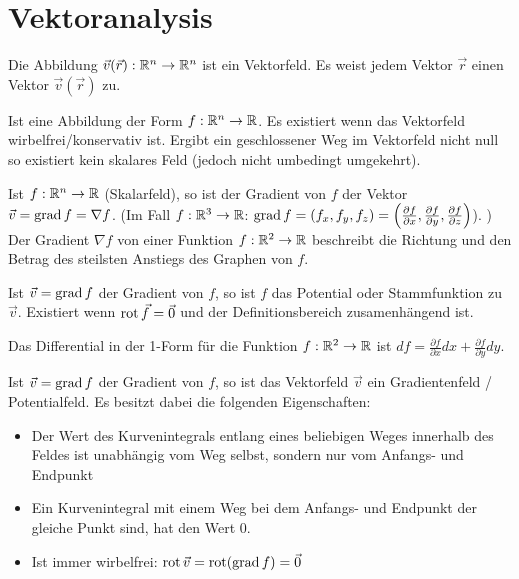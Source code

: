 \section{Vektoranalysis}
\begin{definition}[Vektorfeld]
Die Abbildung $\vec{v}(\vec{r}): \mathbb{R}^n \to \mathbb{R}^n$ ist ein Vektorfeld. Es weist jedem
Vektor $\vec{r}$ einen Vektor $\vec{v}(\vec{r})$ zu.
\end{definition}

\begin{definition}[Skalarfeld]
Ist eine Abbildung der Form $f: \mathbb{R}^n \to \mathbb{R}$. Es existiert wenn das Vektorfeld wirbelfrei/konservativ ist. Ergibt ein geschlossener Weg im Vektorfeld nicht null so existiert kein skalares Feld (jedoch nicht umbedingt umgekehrt).
\end{definition}

\begin{definition}[Gradient]
Ist $f: \mathbb{R}^n \to \mathbb{R}$ (Skalarfeld), so ist der Gradient von $f$ der Vektor
$\vec{v} = \operatorname{grad} f = \nabla f$. (Im Fall $f: \mathbb{R}^3 \to \mathbb{R}$:   $\operatorname{grad} f = (f_x, f_y, f_z) =
\left( \frac{\partial f}{\partial x}, \frac{\partial f}{\partial y}, \frac{\partial f}{\partial z} \right)$). ) 
Der Gradient $\nabla f$ von einer Funktion $f : \mathbb{R}^2 \to \mathbb{R}$ beschreibt die Richtung 
und den Betrag des steilsten Anstiegs des Graphen von $f$.
\end{definition}

\begin{definition}[Potential]
Ist $\vec{v} = \operatorname{grad} f$ der Gradient von $f$, so ist $f$ das Potential oder Stammfunktion zu $\vec{v}$.
Existiert wenn $\operatorname{rot} \vec{f} = \vec{0}$ und der Definitionsbereich zusamenhängend ist.
\end{definition}

\begin{definition}
Das Differential in der 1-Form für die Funktion $f : \mathbb{R}^2 \to \mathbb{R}$ ist $df =  \frac{\partial f}{\partial x}dx + \frac{\partial f}{\partial y}dy$.
\end{definition}

\begin{definition}
Ist $\vec{v} = \operatorname{grad} f$ der Gradient von $f$, so ist das Vektorfeld $\vec{v}$
ein Gradientenfeld / Potentialfeld. Es besitzt dabei die folgenden
Eigenschaften:
\begin{itemize}
	\item Der Wert des Kurvenintegrals entlang eines beliebigen Weges innerhalb des
	Feldes ist unabhängig vom Weg selbst, sondern nur vom Anfangs- und Endpunkt
	\item Ein Kurvenintegral mit einem Weg bei dem Anfangs- und Endpunkt der
	gleiche Punkt sind, hat den Wert 0.
	\item Ist immer wirbelfrei: $\operatorname{rot} \vec{v} = \operatorname{rot}(\operatorname{grad} f) = \vec{0}$
\end{itemize}
\end{definition}

